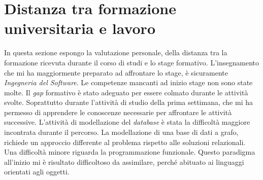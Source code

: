 \section{Distanza tra formazione universitaria e lavoro}
In questa sezione espongo la valutazione personale, della distanza tra la formazione ricevuta durante il corso di studi e lo stage formativo. 
L'insegnamento che mi ha maggiormente preparato ad affrontare lo stage, è sicuramente \emph{Ingegneria del Software}.
Le competenze mancanti ad inizio stage non sono state molte.
Il \emph{gap} formativo è stato adeguato per essere colmato durante le attività svolte. Soprattutto durante l'attività di studio della prima settimana, che mi ha permesso di apprendere le conoscenze necessarie per affrontare le attività successive.
L'attività di modellazione del \emph{database} è stata la difficoltà maggiore incontrata durante il percorso. La modellazione di una base di dati a grafo, richiede un approccio differente al problema rispetto alle soluzioni relazionali.
Una difficoltà minore riguarda la programmazione funzionale. Questo paradigma all'inizio mi è risultato difficoltoso da assimilare, perché abituato ai linguaggi orientati agli oggetti. %
